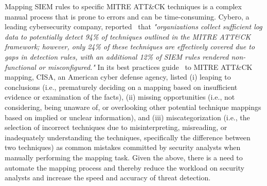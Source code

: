 Mapping SIEM rules to specific MITRE ATT\&CK techniques is a complex manual process that is prone to errors and can be time-consuming.
Cybero, a leading cybersecurity company, reported~\cite{cybero} that \textit{"organizations collect sufficient log data to potentially detect 94\% of techniques outlined in the MITRE ATT\&CK framework; however, only 24\% of these techniques are effectively covered due to gaps in detection rules, with an additional 12\% of SIEM rules rendered non-functional or misconfigured."} 
In its best practices guide~\cite{cisa} to MITRE ATT\&CK mapping, CISA, an American cyber defense agency, listed (i) leaping to conclusions (i.e., prematurely deciding on a mapping based on insufficient evidence or examination of the facts), (ii) missing opportunities (i.e., not considering, being unaware of, or overlooking other potential technique mappings based on implied or unclear information), and (iii) miscategorization (i.e., the selection of incorrect techniques due to misinterpreting, misreading, or inadequately understanding the techniques, specifically the difference between two techniques) as common mistakes committed by security analysts when manually performing the mapping task.
Given the above, there is a need to automate the mapping process and thereby reduce the workload on security analysts and increase the speed and accuracy of threat detection.

